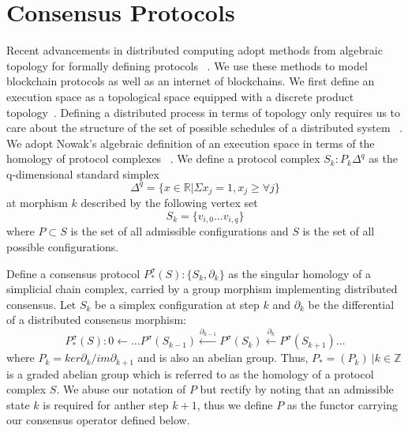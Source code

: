 \documentclass[runningheads]{llncs}
\begin{document}
\section{Consensus Protocols}
Recent advancements in distributed computing adopt methods from algebraic topology for formally defining protocols ~\cite{ref_article1,ref_article2}. We use these methods to model blockchain protocols as well as an internet of blockchains. We first define an execution space as a topological space equipped with a discrete product topology~\cite{ref_article3}. Defining a distributed process in terms of topology only requires us to care about the structure of the set of possible schedules of a distributed system ~\cite{ref_article4}. We adopt Nowak's algebraic definition of an execution space in terms of the homology of protocol complexes ~\cite{ref_article2}. We define a protocol complex $S_k: P_k{\Delta^q}$ as the q-dimensional standard simplex
\begin{equation}
\Delta^q = \{x \in \mathbb{R} | \Sigma x_j = 1, x_j \geq \forall j \}
\end{equation} 
at morphism $k$ described by the following vertex set
\begin{equation}
S_k = \{v_{i,0} \dots v_{i,q}\}
\end{equation}
where $P \subset S$ is the set of all admissible configurations and $S$ is the set of all possible configurations.

Define a consensus protocol $P^\sigma_{*}(S):\{S_k, \partial_k\}$ as the singular homology of a simplicial chain complex, carried by a group morphism implementing distributed consensus. Let $S_k$ be a simplex configuration at step $k$ and $\partial_k$ be the differential of a distributed consensus morphism:
\begin{equation}
P^\sigma_{*}(S): 0 \leftarrow \dots P^\sigma(S_{k-1})\xleftarrow {\partial_{k-1}} P^\sigma(S_{k})\xleftarrow {\partial_{k}} P^\sigma(S_{k+1}) \dots
\end{equation}
where $P_k = ker \partial_k / im \partial_{k+1}$ and is also an abelian group. Thus, $P_*= (P_k) \ | k \in \mathbb{Z}$ is a graded abelian group which is referred to as the homology of a protocol complex $S$. We abuse our notation of $P$ but rectify by noting that an admissible state $k$ is required for anther step $k + 1$, thus we define $P$ as the functor carrying our consensus operator defined below.
\end{document}

